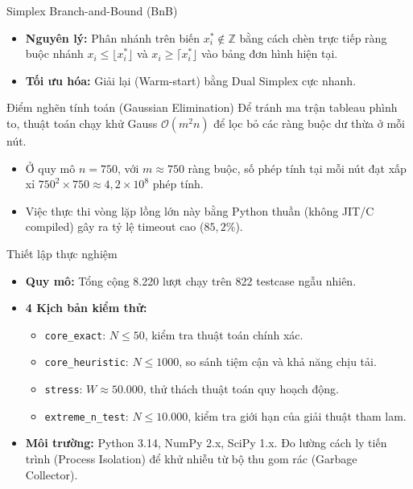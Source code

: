 \documentclass[10pt]{beamer}
\begin{document}
\begin{frame}{Simplex Branch-and-Bound (BnB)}
    \begin{itemize}
        \item \textbf{Nguyên lý:} Phân nhánh trên biến $x_i^* \notin \mathbb{Z}$ bằng cách chèn trực tiếp ràng buộc nhánh $x_i \le \lfloor x_i^* \rfloor$ và $x_i \ge \lceil x_i^* \rfloor$ vào bảng đơn hình hiện tại.
        \item \textbf{Tối ưu hóa:} Giải lại (Warm-start) bằng Dual Simplex cực nhanh.
    \end{itemize}
    \begin{block}{Điểm nghẽn tính toán (Gaussian Elimination)}
        Để tránh ma trận tableau phình to, thuật toán chạy khử Gauss $\mathcal{O}(m^2 n)$ để lọc bỏ các ràng buộc dư thừa ở mỗi nút.
        \begin{itemize}
            \item Ở quy mô $n = 750$, với $m \approx 750$ ràng buộc, số phép tính tại mỗi nút đạt xấp xỉ $750^2 \times 750 \approx 4,2 \times 10^8$ phép tính.
            \item Việc thực thi vòng lặp lồng lớn này bằng Python thuần (không JIT/C compiled) gây ra tỷ lệ timeout cao ($85,2\%$).
        \end{itemize}
    \end{block}
\end{frame}

\begin{frame}{Thiết lập thực nghiệm}
    \begin{itemize}
        \item \textbf{Quy mô:} Tổng cộng 8.220 lượt chạy trên 822 testcase ngẫu nhiên.
        \item \textbf{4 Kịch bản kiểm thử:}
            \begin{itemize}
                \item \texttt{core\_exact}: $N \le 50$, kiểm tra thuật toán chính xác.
                \item \texttt{core\_heuristic}: $N \le 1000$, so sánh tiệm cận và khả năng chịu tải.
                \item \texttt{stress}: $W \approx 50.000$, thử thách thuật toán quy hoạch động.
                \item \texttt{extreme\_n\_test}: $N \le 10.000$, kiểm tra giới hạn của giải thuật tham lam.
            \end{itemize}
        \item \textbf{Môi trường:} Python 3.14, NumPy 2.x, SciPy 1.x. Đo lường cách ly tiến trình (Process Isolation) để khử nhiễu từ bộ thu gom rác (Garbage Collector).
    \end{itemize}
\end{frame}
\end{document}
